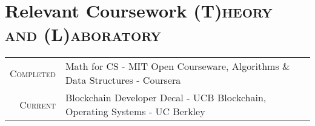 \documentclass[a4paper,10pt]{extarticle} %
\begin{document}

\vspace{-0.05cm}
\section{\textcolor{primary}{Relevant Coursework}
\hfill\small\textsc{(T)heory and (L)aboratory}}

\begin{tabular}{r|p{15cm}}
\textsc{Completed} & Math for CS - MIT Open Courseware, Algorithms \& Data Structures - Coursera  \\
\textsc{Current} & Blockchain Developer Decal - UCB Blockchain, Operating Systems - UC Berkley
\end{tabular}

\end{document}
